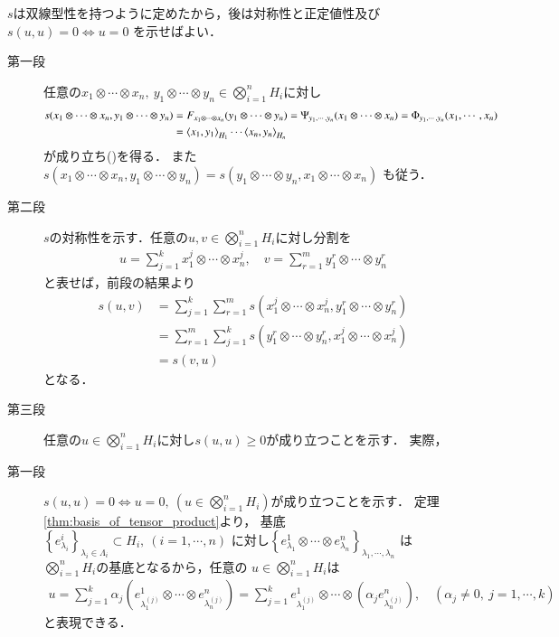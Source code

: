 	\begin{prf} $s$は双線型性を持つように定めたから，後は対称性と正定値性及び$s(u,u)=0 \Leftrightarrow u=0$
		を示せばよい．
		\begin{description}
			\item[第一段]
				任意の$x_1 \otimes \cdots \otimes x_n,\ y_1 \otimes \cdots \otimes y_n 
				\in \bigotimes_{i=1}^n H_i$に対し
				\begin{align}
					s(x_1 \otimes \cdots \otimes x_n,y_1 \otimes \cdots \otimes y_n)
					&= F_{x_1 \otimes \cdots \otimes x_n}(y_1 \otimes \cdots \otimes y_n)
					= \Psi_{y_1,\cdots,y_n}(x_1 \otimes \cdots \otimes x_n)
					= \Phi_{y_1,\cdots,y_n}(x_1, \cdots, x_n) \\
					&= \inprod<x_1,y_1>_{H_1} \cdots \inprod<x_n,y_n>_{H_n}
				\end{align}
				が成り立ち()を得る．
				また$s(x_1 \otimes \cdots \otimes x_n,y_1 \otimes \cdots \otimes y_n)
				= s(y_1 \otimes \cdots \otimes y_n,x_1 \otimes \cdots \otimes x_n)$
				も従う．
				
			\item[第二段]
				$s$の対称性を示す．任意の$u,v \in \bigotimes_{i=1}^n H_i$に対し分割を
				\begin{align}
					u = \sum_{j=1}^k x^j_1 \otimes \cdots \otimes x^j_n,
					\quad v = \sum_{r=1}^m y^r_1 \otimes \cdots \otimes y^r_n
				\end{align}
				と表せば，前段の結果より
				\begin{align}
					s(u,v) &= \sum_{j=1}^k \sum_{r=1}^m s(x^j_1 \otimes \cdots \otimes x^j_n,y^r_1 \otimes \cdots \otimes y^r_n) \\
					&= \sum_{r=1}^m \sum_{j=1}^k s(y^r_1 \otimes \cdots \otimes y^r_n,x^j_1 \otimes \cdots \otimes x^j_n) \\
					&= s(v,u)
				\end{align}
				となる．
				
			\item[第三段]
				任意の$u \in \bigotimes_{i=1}^n H_i$に対し$s(u,u) \geq 0$が成り立つことを示す．
				実際，
				
			\item[第一段]
				$s(u,u)=0 \Leftrightarrow u=0,\ (u \in \bigotimes_{i=1}^n H_i)$が成り立つことを示す．
				定理\ref{thm:basis_of_tensor_product}より，
				基底$\left\{ e^i_{\lambda_i} \right\}_{\lambda_i \in \Lambda_i} \subset H_i,\ (i=1,\cdots,n)$
				に対し$\left\{ e^1_{\lambda_1} \otimes \cdots \otimes e^n_{\lambda_n} \right\}_{\lambda_1,\cdots,\lambda_n}$
				は$\bigotimes_{i=1}^n H_i$の基底となるから，任意の
				$u \in \bigotimes_{i=1}^n H_i$は
				\begin{align}
					u = \sum_{j=1}^k \alpha_j \left( e^1_{\lambda^{(j)}_1} \otimes \cdots \otimes e^n_{\lambda^{(j)}_n} \right)
					= \sum_{j=1}^k e^1_{\lambda^{(j)}_1} \otimes \cdots \otimes \left( \alpha_j e^n_{\lambda^{(j)}_n} \right),
					\quad (\alpha_j \neq 0,\ j=1,\cdots,k)
				\end{align}
				と表現できる．
		\end{description}
	\end{prf}
	
